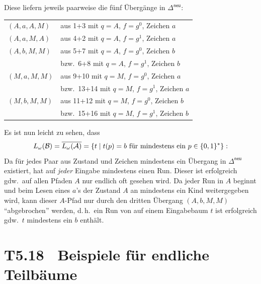 \documentclass[fontsize=11pt, twoside=false, numbers=autoenddot]{scrbook}
\begin{document}
%
Diese liefern jeweils paarweise die fünf Übergänge in $\Delta^{\textsf{neu}}$:
%
\begin{center}
  \begin{tabular}{@{}ll@{}}
    $(A,a,A,M)$ & aus 1+3 mit $q=A$, $f=g^0$, Zeichen $a$ \\
    $(A,a,M,A)$ & aus 4+2 mit $q=A$, $f=g^1$, Zeichen $a$ \\
    $(A,b,M,M)$ & aus 5+7 mit $q=A$, $f=g^0$, Zeichen $b$ \\
                & bzw.\ 6+8 mit $q=A$, $f=g^1$, Zeichen $b$ \\
    $(M,a,M,M)$ & aus 9+10 mit $q=M$, $f=g^0$, Zeichen $a$ \\
                & bzw.\ 13+14 mit $q=M$, $f=g^1$, Zeichen $a$ \\
    $(M,b,M,M)$ & aus 11+12 mit $q=M$, $f=g^0$, Zeichen $b$ \\
                & bzw.\ 15+16 mit $q=M$, $f=g^1$, Zeichen $b$ \\
  \end{tabular}
\end{center}
%
Es ist nun leicht zu sehen, dass
\[
  L_\omega(\mathcal{B}) = \overline{L_\omega(\mathcal{A})} = \{t \mid t(p) = b \text{~für mindestens ein~} p \in \{0,1\}^*\}:
\]
Da für jedes Paar aus Zustand und Zeichen mindestens ein Übergang in $\Delta^{\textsf{neu}}$ existiert,
hat \Bmc auf \emph{jeder} Eingabe mindestens einen Run. Dieser ist erfolgreich
gdw.\ auf allen Pfaden $A$ nur endlich oft gesehen wird.
Da jeder Run in $A$ beginnt und beim Lesen eines $a$'s der Zustand $A$ an mindestens ein Kind weitergegeben wird,
kann dieser $A$-Pfad nur durch den dritten Übergang $(A,b,M,M)$ "`abgebrochen"' werden,
d.\,h.\ ein Run von \Bmc auf einem Eingabebaum $t$ ist erfolgreich gdw.\ 
$t$ mindestens ein $b$ enthält.

\pagebreak
\section*{T5.18~ Beispiele für endliche Teilbäume}
\end{document}

